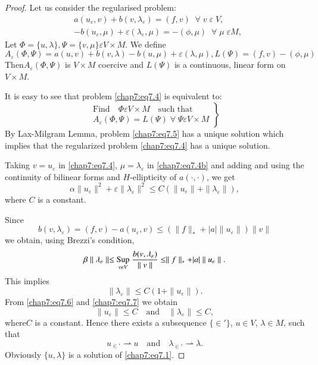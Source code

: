 \begin{proof}
Let us consider the regularised problem:
\begin{align*}
& a(u_\varepsilon,v)+b(v,\lambda_\varepsilon)=(f,v)\;\; \forall\;v\;\varepsilon
\;V,\tag{7.4}\label{chap7:eq7.4} \\
& -b(u_\varepsilon,\mu)+\varepsilon(\lambda_\varepsilon,\mu)=-(\phi,\mu)\; \; \forall
\;\mu\;\varepsilon M,\tag{7.4b}\label{chap7:eq7.4b}
\end{align*}
Let $\Phi =\{u,\lambda\}, \Psi =\{v,\mu\}\varepsilon V\times M$. We
define 
$$
A_\varepsilon(\Phi,\Psi)=a(u,v)+b(v,\lambda)-b(u,\mu)+\varepsilon(\lambda,
\mu), L(\Psi)=(f,v)-(\phi,\mu)
$$
Then\pageoriginale $A_\varepsilon(\Phi,\Psi)$ is $V\times M$ coercive
and $L(\Psi)$ is a continuous, linear form on $V\times M$.

It is easy to see that problem \eqref{chap7:eq7.4} is equivalent to:
\setcounter{equation}{4}
\begin{equation}\label{chap7:eq7.5}
\left.
\begin{aligned}
\text{Find}\quad\Phi\varepsilon V\times M\quad\text{such that}\\
A_\varepsilon(\Phi,\Psi)=L(\Psi) \; \forall \; \Psi\varepsilon V\times M
\end{aligned} 
\right\}
\end{equation}
By Lax-Milgram Lemma, problem \eqref{chap7:eq7.5} has a unique
solution which implies that the regularized problem
\eqref{chap7:eq7.4} has a unique solution. 

Taking $v=u_\varepsilon$ in \eqref{chap7:eq7.4}, $\mu=\lambda_\varepsilon$ in
\eqref{chap7:eq7.4b} and adding and using the continuity of bilinear forms and
$H$-ellipticity of $a(\cdotp,\cdotp)$, we get 
\begin{equation}\label{chap7:eq7.6}
\alpha\parallel u_\varepsilon\parallel^2+\varepsilon\parallel
\lambda_\varepsilon\parallel^2\leq C\left(\parallel u_\varepsilon
\parallel +\parallel\lambda_\varepsilon\parallel\right),
\end{equation}
where $C$ is a constant.

Since
$$
b(v,\lambda_\varepsilon)=(f,v)-a(u_\varepsilon,v)\leq\left(\parallel
f\parallel_* +|a|\parallel u_\varepsilon\parallel\right)\parallel
v\parallel 
$$
we obtain, using Brezzi's condition, 
$$
\beta\parallel\lambda_\varepsilon\parallel\leq\underset{v\varepsilon V}
{\operatorname{Sup}}\; \frac{b(v,\lambda_\varepsilon)}{\parallel v\parallel}\leq
\parallel f\parallel_*+|a|\parallel u_\varepsilon\parallel.
$$
This implies 
\begin{equation}\label{chap7:eq7.7}
\parallel\lambda_\varepsilon\parallel\leq C\left(1+\parallel
u_\varepsilon \parallel\right).
\end{equation}
From \eqref{chap7:eq7.6} and \eqref{chap7:eq7.7} we obtain 
$$
\parallel u_\varepsilon \parallel \leq C\quad\text{and}\quad \parallel
\lambda_\varepsilon\parallel\leq C,
$$
where\pageoriginale $C$ is a constant. Hence there exists a
subsequence $\{\in'\}$, $u\in V$, $\lambda\in M$,
such that 
$$
u_{\in'}\rightharpoonup u\quad\text{and}\quad
\lambda_{\in'}\rightharpoonup\lambda.
$$
Obviously $\{u,\lambda\}$ is a solution of \eqref{chap7:eq7.1}.


\end{proof}
